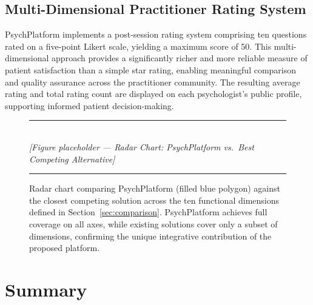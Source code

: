 \subsection{Multi-Dimensional Practitioner Rating System}

PsychPlatform implements a post-session rating system comprising ten questions
rated on a five-point Likert scale, yielding a maximum score of 50. This
multi-dimensional approach provides a significantly richer and more reliable
measure of patient satisfaction than a simple star rating, enabling meaningful
comparison and quality assurance across the practitioner community. The resulting
average rating and total rating count are displayed on each psychologist's public
profile, supporting informed patient decision-making.

\begin{figure}[H]
  \centering
  \rule{0.85\textwidth}{0.4pt}\\[6pt]
  {\small\itshape [Figure placeholder — Radar Chart: PsychPlatform vs.\ Best Competing Alternative]}
  \rule{0.85\textwidth}{0.4pt}
  \caption{Radar chart comparing PsychPlatform (filled blue polygon) against the
           closest competing solution across the ten functional dimensions defined
           in Section~\ref{sec:comparison}. PsychPlatform achieves full coverage
           on all axes, while existing solutions cover only a subset of dimensions,
           confirming the unique integrative contribution of the proposed platform.}
  \label{fig:radar-chart}
\end{figure}

\section*{Summary}

